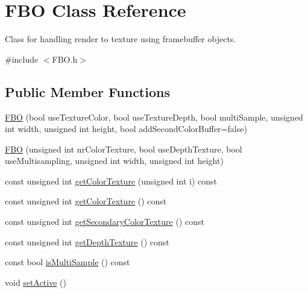 \hypertarget{class_f_b_o}{}\section{F\+BO Class Reference}
\label{class_f_b_o}


Class for handling render to texture using framebuffer objects.  




{\ttfamily \#include $<$F\+B\+O.\+h$>$}

\subsection*{Public Member Functions}
\begin{DoxyCompactItemize}
\item 
\mbox{\hyperlink{class_f_b_o_a2948b029f198e0298617ce7749ebce07}{F\+BO}} (bool use\+Texture\+Color, bool use\+Texture\+Depth, bool multi\+Sample, unsigned int width, unsigned int height, bool add\+Second\+Color\+Buffer=false)
\item 
\mbox{\hyperlink{class_f_b_o_a8e07c3b50fdd03a8df93f73c89d5e6cd}{F\+BO}} (unsigned int nr\+Color\+Texture, bool use\+Depth\+Texture, bool use\+Multisampling, unsigned int width, unsigned int height)
\item 
const unsigned int \mbox{\hyperlink{class_f_b_o_ae5051caff550fc37a9b2f1800ff02ed6}{get\+Color\+Texture}} (unsigned int i) const
\item 
const unsigned int \mbox{\hyperlink{class_f_b_o_a18441302a3220a0f24a69a4eea1959c0}{get\+Color\+Texture}} () const
\item 
const unsigned int \mbox{\hyperlink{class_f_b_o_a12cf770f6b67937a89b13cdeb5d5aeb1}{get\+Secondary\+Color\+Texture}} () const
\item 
const unsigned int \mbox{\hyperlink{class_f_b_o_a7463991775d4c862d55108f918b0b2f9}{get\+Depth\+Texture}} () const
\item 
const bool \mbox{\hyperlink{class_f_b_o_a0d20c728cb85513791a853695ee527a6}{is\+Multi\+Sample}} () const
\item 
void \mbox{\hyperlink{class_f_b_o_a0372e62761da8e6e073c8c05b9dfb8f7}{set\+Active}} ()
\end{DoxyCompactItemize}
